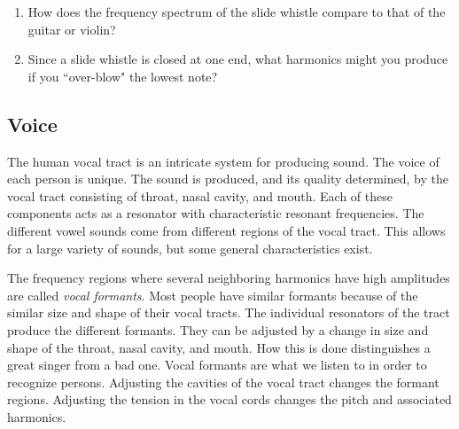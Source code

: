 \documentclass[11pt]{NSF}
\def\ben{\begin{enumerate}}
\def\een{\end{enumerate}}
\begin{document}
\ben
\item
How does the frequency spectrum of the slide whistle compare to that 
of the guitar or violin?

\item Since a slide whistle is closed at one end, what harmonics might 
you produce if you ``over-blow" the lowest note?

\een

\subsection{Voice}

The human vocal tract is an intricate system for producing sound. The
voice of each person is unique. The sound is produced, and its quality
determined, by the vocal tract consisting of throat, nasal cavity, and
mouth. Each of these components acts as a resonator with
characteristic resonant frequencies. The different vowel sounds come
from different regions of the vocal tract. This allows for a large
variety of sounds, but some general characteristics exist.

The frequency regions where several neighboring harmonics have high
amplitudes are called {\em vocal formants}. Most people have similar
formants because of the similar size and shape of their vocal tracts. 
The individual resonators of the tract produce the different formants.
They can be adjusted by a change in size and shape of the throat,
nasal cavity, and mouth. How this is done distinguishes a great singer
from a bad one. Vocal formants are what we listen to in order to
recognize persons. Adjusting the cavities of the vocal tract changes
the formant regions. Adjusting the tension in the vocal cords changes
the pitch and associated harmonics.
\end{document}
